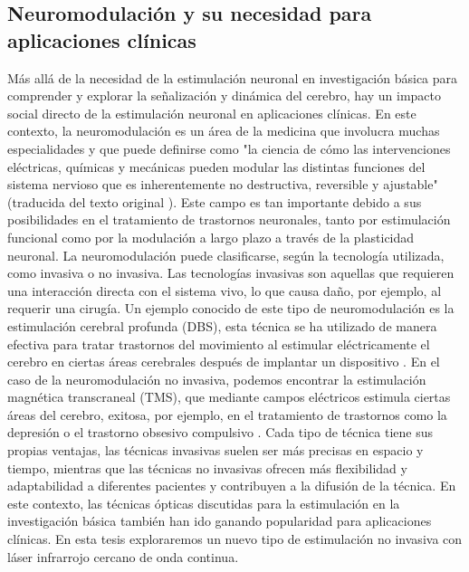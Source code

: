 \subsection{Neuromodulación y su necesidad para aplicaciones clínicas}

Más allá de la necesidad de la estimulación neuronal en investigación básica para comprender y explorar la señalización y dinámica del cerebro, hay un impacto social directo de la estimulación neuronal en aplicaciones clínicas. En este contexto, la neuromodulación es un área de la medicina que involucra muchas especialidades y que puede definirse como "la ciencia de cómo las intervenciones eléctricas, químicas y mecánicas pueden modular las distintas funciones del sistema nervioso que es inherentemente no destructiva, reversible y ajustable" (traducida del texto original \cite{krames_neuromodulation_2009}). Este campo es tan importante debido a sus posibilidades en el tratamiento de trastornos neuronales, tanto por estimulación funcional como por la modulación a largo plazo a través de la plasticidad neuronal. La neuromodulación puede clasificarse, según la tecnología utilizada, como invasiva o no invasiva. Las tecnologías invasivas son aquellas que requieren una interacción directa con el sistema vivo, lo que causa daño, por ejemplo, al requerir una cirugía. Un ejemplo conocido de este tipo de neuromodulación es la estimulación cerebral profunda (DBS), esta técnica se ha utilizado de manera efectiva para tratar trastornos del movimiento al estimular eléctricamente el cerebro en ciertas áreas cerebrales después de implantar un dispositivo \parencite{limousin_longterm_2019, hariz_deep_2022}. En el caso de la neuromodulación no invasiva, podemos encontrar la estimulación magnética transcraneal (TMS), que mediante campos eléctricos estimula ciertas áreas del cerebro, exitosa, por ejemplo, en el tratamiento de  trastornos como la depresión o el trastorno obsesivo compulsivo \parencite{valero-cabre_transcranial_2017, clarke_patients_2018}. Cada tipo de técnica tiene sus propias ventajas, las técnicas invasivas suelen ser más precisas en espacio y tiempo, mientras que las técnicas no invasivas ofrecen más flexibilidad y adaptabilidad a diferentes pacientes y contribuyen a la difusión de la técnica. En este contexto, las técnicas ópticas discutidas para la estimulación en la investigación básica también han ido ganando popularidad para aplicaciones clínicas. En esta tesis exploraremos un nuevo tipo de estimulación no invasiva con láser infrarrojo cercano de onda continua. 
